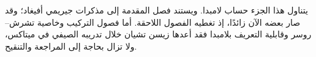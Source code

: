 \documentclass[../../include/open-logic-part]{subfiles}
\begin{document}

\begin{editorial}
يتناول هذا الجزء حساب لامبدا. ويستند فصل المقدمة إلى مذكرات جيريمي
أفيغاد؛ وقد صار بعضه الآن زائدًا، إذ تغطيه الفصول اللاحقة. أما فصول
التركيب وخاصية تشرش--روسر وقابلية التعريف بلامبدا فقد أعدها زيسن تشيان
خلال تدريبه الصيفي في ميتاكس، ولا تزال بحاجة إلى المراجعة والتنقيح.
\end{editorial}





\OLEndPartHook
\end{document}
